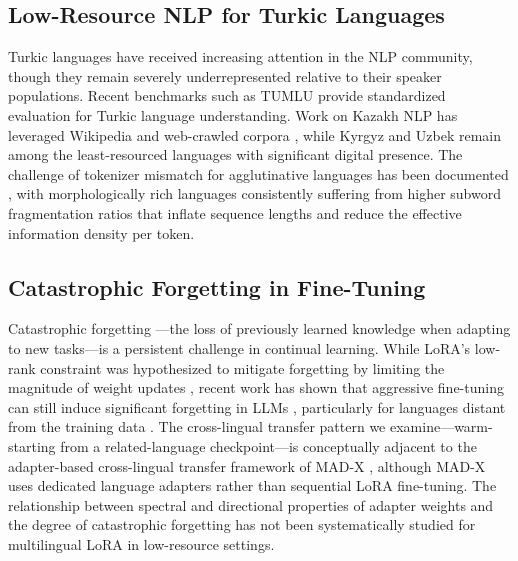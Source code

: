 \documentclass[11pt]{article}
\begin{document}
\subsection{Low-Resource NLP for Turkic Languages}

Turkic languages have received increasing attention in the NLP community, though they remain severely underrepresented relative to their speaker populations. Recent benchmarks such as TUMLU \cite{isbarov2024tumlu} provide standardized evaluation for Turkic language understanding. Work on Kazakh NLP has leveraged Wikipedia and web-crawled corpora \cite{yeshpanov2024kazllm}, while Kyrgyz and Uzbek remain among the least-resourced languages with significant digital presence. The challenge of tokenizer mismatch for agglutinative languages has been documented \cite{rust2021good,ahia2023all}, with morphologically rich languages consistently suffering from higher subword fragmentation ratios that inflate sequence lengths and reduce the effective information density per token.

\subsection{Catastrophic Forgetting in Fine-Tuning}

Catastrophic forgetting \cite{mccloskey1989catastrophic,kirkpatrick2017overcoming}---the loss of previously learned knowledge when adapting to new tasks---is a persistent challenge in continual learning. While LoRA's low-rank constraint was hypothesized to mitigate forgetting by limiting the magnitude of weight updates \cite{biderman2024lora}, recent work has shown that aggressive fine-tuning can still induce significant forgetting in LLMs \cite{luo2023forget,kotha2024understanding}, particularly for languages distant from the training data \cite{csaki2024sambalingo}. The cross-lingual transfer pattern we examine---warm-starting from a related-language checkpoint---is conceptually adjacent to the adapter-based cross-lingual transfer framework of MAD-X \cite{pfeiffer2020madx}, although MAD-X uses dedicated language adapters rather than sequential LoRA fine-tuning. The relationship between spectral and directional properties of adapter weights and the degree of catastrophic forgetting has not been systematically studied for multilingual LoRA in low-resource settings.

\end{document}
